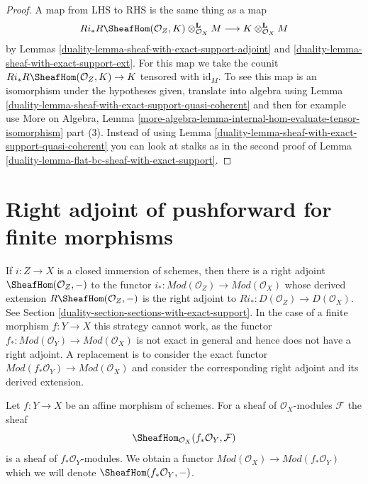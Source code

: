 \begin{proof}

A map from LHS to RHS is the same thing as a map
$$
Ri_*R\SheafHom(\mathcal{O}_Z, K) \otimes_{\mathcal{O}_X}^\mathbf{L} M
\longrightarrow
K \otimes_{\mathcal{O}_X}^\mathbf{L} M
$$
by Lemmas \ref{duality-lemma-sheaf-with-exact-support-adjoint} and
\ref{duality-lemma-sheaf-with-exact-support-ext}. For this map we take the
counit $Ri_*R\SheafHom(\mathcal{O}_Z, K) \to K$ tensored with $\text{id}_M$.
To see this map is an isomorphism under the hypotheses given,
translate into algebra using
Lemma \ref{duality-lemma-sheaf-with-exact-support-quasi-coherent}
and then for example use More on Algebra, Lemma
\ref{more-algebra-lemma-internal-hom-evaluate-tensor-isomorphism} part (3).
Instead of using Lemma \ref{duality-lemma-sheaf-with-exact-support-quasi-coherent}
you can look at stalks as in the second proof of
Lemma \ref{duality-lemma-flat-bc-sheaf-with-exact-support}.
\end{proof}

\section{Right adjoint of pushforward for finite morphisms}
\label{duality-section-duality-finite}
If $i : Z \to X$ is a closed immersion of schemes, then there is
a right adjoint $\SheafHom(\mathcal{O}_Z, -)$ to the functor
$i_* : \textit{Mod}(\mathcal{O}_Z) \to \textit{Mod}(\mathcal{O}_X)$
whose derived extension $R\SheafHom(\mathcal{O}_Z, -)$
is the right adjoint to $Ri_* : D(\mathcal{O}_Z) \to D(\mathcal{O}_X)$. See
Section \ref{duality-section-sections-with-exact-support}.
In the case of a finite morphism $f : Y \to X$ this strategy
cannot work, as the functor
$f_* : \textit{Mod}(\mathcal{O}_Y) \to \textit{Mod}(\mathcal{O}_X)$
is not exact in general and hence does not have a right adjoint.
A replacement is to consider the exact functor
$\textit{Mod}(f_*\mathcal{O}_Y) \to \textit{Mod}(\mathcal{O}_X)$
and consider the corresponding right adjoint and its derived
extension.

\medskip\noindent
Let $f : Y \to X$ be an affine morphism of schemes. For a sheaf
of $\mathcal{O}_X$-modules $\mathcal{F}$ the sheaf
$$
\SheafHom_{\mathcal{O}_X}(f_*\mathcal{O}_Y, \mathcal{F})
$$
is a sheaf of $f_*\mathcal{O}_Y$-modules. We obtain a functor
$\textit{Mod}(\mathcal{O}_X) \to \textit{Mod}(f_*\mathcal{O}_Y)$
which we will denote $\SheafHom(f_*\mathcal{O}_Y, -)$.


